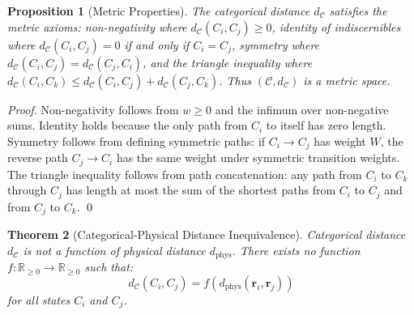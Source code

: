 \documentclass[12pt,a4paper]{article}
\newtheorem{theorem}{Theorem}[section]
\newtheorem{proposition}[theorem]{Proposition}
\theoremstyle{definition}
\theoremstyle{remark}
\newcommand{\catspace}{\mathcal{C}}
\begin{document}
\begin{proposition}[Metric Properties]
\label{prop:metric_properties}
The categorical distance $d_{\catspace}$ satisfies the metric axioms: non-negativity where $d_{\catspace}(C_i, C_j) \geq 0$, identity of indiscernibles where $d_{\catspace}(C_i, C_j) = 0$ if and only if $C_i = C_j$, symmetry where $d_{\catspace}(C_i, C_j) = d_{\catspace}(C_j, C_i)$, and the triangle inequality where $d_{\catspace}(C_i, C_k) \leq d_{\catspace}(C_i, C_j) + d_{\catspace}(C_j, C_k)$. Thus $(\catspace, d_{\catspace})$ is a metric space.
\end{proposition}

\begin{proof}
Non-negativity follows from $w \geq 0$ and the infimum over non-negative sums. Identity holds because the only path from $C_i$ to itself has zero length. Symmetry follows from defining symmetric paths: if $C_i \to C_j$ has weight $W$, the reverse path $C_j \to C_i$ has the same weight under symmetric transition weights. The triangle inequality follows from path concatenation: any path from $C_i$ to $C_k$ through $C_j$ has length at most the sum of the shortest paths from $C_i$ to $C_j$ and from $C_j$ to $C_k$. \qed
\end{proof}

\begin{theorem}[Categorical-Physical Distance Inequivalence]
\label{thm:distance_inequivalence}
Categorical distance $d_{\catspace}$ is not a function of physical distance $d_{\text{phys}}$. There exists no function $f: \mathbb{R}_{\geq 0} \to \mathbb{R}_{\geq 0}$ such that:
\begin{equation}
d_{\catspace}(C_i, C_j) = f(d_{\text{phys}}(\mathbf{r}_i, \mathbf{r}_j))
\label{eq:distance_inequivalence}
\end{equation}
for all states $C_i$ and $C_j$.
\end{theorem}
\end{document}

